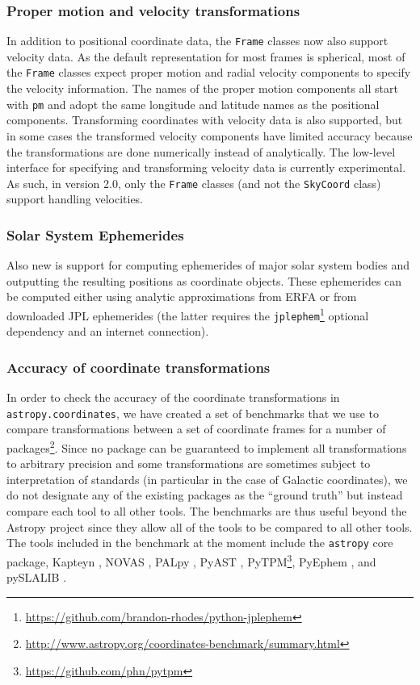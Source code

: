 \documentclass[modern]{aastex62}
\newcommand{\package}[1]{\texttt{#1}\xspace}
\newcommand{\astropy}{Astropy\xspace}
\newcommand{\astropypkg}{\package{astropy}}
\begin{document}
\subsubsection{Proper motion and velocity transformations}
    In addition to positional coordinate data, the \texttt{Frame} classes now
    also support velocity data.
    As the default representation for most frames is spherical, most of the
    \texttt{Frame} classes expect proper motion and radial velocity components
    to specify the velocity information.
    The names of the proper motion components all start with \texttt{pm} and
    adopt the same longitude and latitude names as the positional components.
    Transforming coordinates with velocity data is also supported, but in some
    cases the transformed velocity components have limited accuracy because the
    transformations are done numerically instead of analytically.
    The low-level interface for specifying and transforming velocity data  is
    currently experimental.  As such, in version 2.0, only the \texttt{Frame}
    classes (and not the \texttt{SkyCoord} class) support handling velocities.

\subsubsection{Solar System Ephemerides}
    Also new is support for computing ephemerides of major solar system bodies
    and outputting the resulting positions as coordinate objects.
    These ephemerides can be computed either using analytic approximations from
    ERFA or from downloaded JPL ephemerides (the latter requires the
    \package{jplephem}\footnote{\url{https://github.com/brandon-rhodes/python-jplephem}}
    optional dependency and an internet connection).

\subsubsection{Accuracy of coordinate transformations}

In order to check the accuracy of the coordinate transformations in
\package{astropy.coordinates}, we have created a set of benchmarks that we use
to compare transformations between a set of coordinate frames for a number of
packages\footnote{\url{http://www.astropy.org/coordinates-benchmark/summary.html}}.
Since no package can be guaranteed to implement all transformations to
arbitrary precision and some transformations are sometimes subject to
interpretation of standards (in particular in the case of Galactic coordinates),
we do not designate any of the existing packages as the ``ground truth'' but
instead compare each tool to all other tools. The benchmarks are thus useful
beyond the \astropy project since they allow all of the tools to be compared to
all other tools. The tools included in the benchmark at the moment include the
\astropypkg core package, Kapteyn \citep{kapteyn}, NOVAS \citep{novas},
PALpy \citep{pal}, PyAST \citep[a wrapper for AST, described in][]{ast},
PyTPM\footnote{\url{https://github.com/phn/pytpm}}, PyEphem \citep{pyephem},
and pySLALIB \citep[a Python wrapper for SLALIB, described in][]{slalib}.
\end{document}
